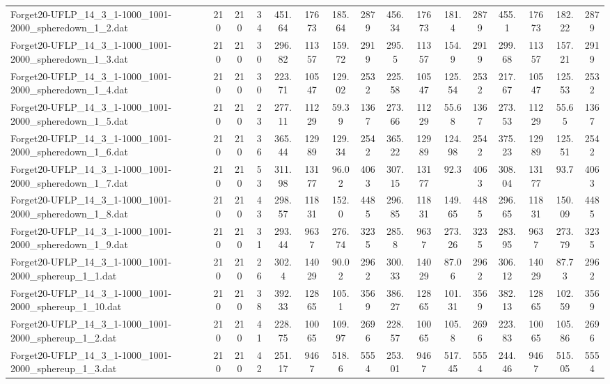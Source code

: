 \begin{sidewaystable}[!ht]
{\begin{tabular}{lccccccccccccccc}
Forget20-UFLP\_14\_3\_1-1000\_1001-2000\_spheredown\_1\_2.dat & 210 & 210 & 34 & 451.64 & 17673 & 185.64 & 2879 & 456.34 & 17673 & 181.4 & 2879 & 455.1 & 17673 & 182.22 & 2879 \\
Forget20-UFLP\_14\_3\_1-1000\_1001-2000\_spheredown\_1\_3.dat & 210 & 210 & 30 & 296.82 & 11357 & 159.72 & 2919 & 295.5 & 11357 & 154.9 & 2919 & 299.68 & 11357 & 157.21 & 2919 \\
Forget20-UFLP\_14\_3\_1-1000\_1001-2000\_spheredown\_1\_4.dat & 210 & 210 & 30 & 223.71 & 10547 & 129.02 & 2532 & 225.58 & 10547 & 125.54 & 2532 & 217.67 & 10547 &  \textcolor{blue2}{125.53} & 2532 \\
Forget20-UFLP\_14\_3\_1-1000\_1001-2000\_spheredown\_1\_5.dat & 210 & 210 & 23 & 277.11 & 11229 & 59.39 & 1367 & 273.66 & 11229 & 55.68 & 1367 & 273.53 & 11229 & 55.65 & 1367 \\
Forget20-UFLP\_14\_3\_1-1000\_1001-2000\_spheredown\_1\_6.dat & 210 & 210 & 36 & 365.44 & 12989 & 129.34 & 2542 & 365.22 & 12989 &  \textcolor{blue2}{124.98} & 2542 & 375.23 & 12989 & 125.51 & 2542 \\
Forget20-UFLP\_14\_3\_1-1000\_1001-2000\_spheredown\_1\_7.dat & 210 & 210 & 53 & 311.98 & 13177 & 96.02 & 4063 & 307.15 & 13177 &  \textcolor{blue2}{92.3} & 4063 & 308.04 & 13177 & 93.7 & 4063 \\
Forget20-UFLP\_14\_3\_1-1000\_1001-2000\_spheredown\_1\_8.dat & 210 & 210 & 43 & 298.57 & 11831 & 152.0 & 4485 & 296.85 & 11831 & 149.65 & 4485 & 296.65 & 11831 & 150.09 & 4485 \\
Forget20-UFLP\_14\_3\_1-1000\_1001-2000\_spheredown\_1\_9.dat & 210 & 210 & 31 & 293.44 & 9637 & 276.74 & 3235 & 285.8 & 9637 & 273.26 & 3235 & 283.95 & 9637 & 273.79 & 3235 \\
Forget20-UFLP\_14\_3\_1-1000\_1001-2000\_sphereup\_1\_1.dat & 210 & 210 & 26 & 302.4 & 14029 & 90.02 & 2962 & 300.33 & 14029 &  \textcolor{blue2}{87.06} & 2962 & 306.12 & 14029 & 87.73 & 2962 \\
Forget20-UFLP\_14\_3\_1-1000\_1001-2000\_sphereup\_1\_10.dat & 210 & 210 & 38 & 392.33 & 12865 & 105.1 & 3569 & 386.27 & 12865 &  \textcolor{blue2}{101.31} & 3569 & 382.13 & 12865 & 102.59 & 3569 \\
Forget20-UFLP\_14\_3\_1-1000\_1001-2000\_sphereup\_1\_2.dat & 210 & 210 & 41 & 228.75 & 10065 & 109.97 & 2696 & 228.57 & 10065 &  \textcolor{blue2}{105.8} & 2696 & 223.83 & 10065 & 105.86 & 2696 \\
Forget20-UFLP\_14\_3\_1-1000\_1001-2000\_sphereup\_1\_3.dat & 210 & 210 & 42 & 251.17 & 9467 & 518.6 & 5554 & 253.01 & 9467 & 517.45 & 5554 & 244.46 & 9467 & 515.05 & 5554 \\

\end{tabular}}
\end{sidewaystable}
